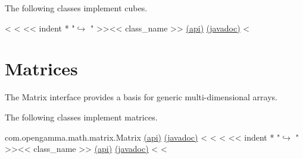 The following classes implement cubes.

\begin{fullwidth}
<%
<%
<< indent * "$\hookrightarrow$ " >><< class_name >> \href{http://docs-static.hq.opengamma.com/0.7.0/analytics/api/<< package_name >>.html#class-<<class_name>>}{(api)} \href{http://docs-static.hq.opengamma.com/0.7.0/java/javadocs/<< class_name.replace(".","/") >>.html}{(javadoc)}
<%
\end{fullwidth}

\section{Matrices}

The Matrix interface provides a basis for generic multi-dimensional arrays.

The following classes implement matrices.

\begin{fullwidth}

com.opengamma.math.matrix.Matrix \href{http://docs-static.hq.opengamma.com/0.7.0/analytics/api/com.opengamma.math.matrix.Matrix.html#class-com.opengamma.math.matrix.Matrix}{(api)} \href{http://docs-static.hq.opengamma.com/0.7.0/analytics/javadoc/com/opengamma/math/matrix/Matrix}{(javadoc)}
<%
<%
<%
<< indent * "$\hookrightarrow$ " >><< class_name >> \href{http://docs-static.hq.opengamma.com/0.7.0/analytics/api/<< package_name >>.html#class-<<class_name>>}{(api)} \href{http://docs-static.hq.opengamma.com/0.7.0/java/javadocs/<< class_name.replace(".","/") >>.html}{(javadoc)}
<%
<%

\end{fullwidth}

